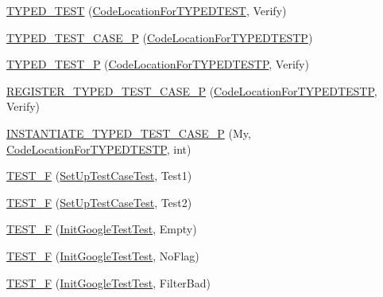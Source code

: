 \begin{DoxyCompactItemize}
\item 
\hyperlink{namespacetesting_a400c572f732b06e836d6b3a5adfc4cf7}{T\+Y\+P\+E\+D\+\_\+\+T\+E\+ST} (\hyperlink{classtesting_1_1_code_location_for_t_y_p_e_d_t_e_s_t}{Code\+Location\+For\+T\+Y\+P\+E\+D\+T\+E\+ST}, Verify)
\item 
\hyperlink{namespacetesting_a439eefbc85668f74fd9e0c2cb7c7d0b0}{T\+Y\+P\+E\+D\+\_\+\+T\+E\+S\+T\+\_\+\+C\+A\+S\+E\+\_\+P} (\hyperlink{classtesting_1_1_code_location_for_t_y_p_e_d_t_e_s_t_p}{Code\+Location\+For\+T\+Y\+P\+E\+D\+T\+E\+S\+TP})
\item 
\hyperlink{namespacetesting_a3f3fbbc7ecc23117307b81deb8f4cfac}{T\+Y\+P\+E\+D\+\_\+\+T\+E\+S\+T\+\_\+P} (\hyperlink{classtesting_1_1_code_location_for_t_y_p_e_d_t_e_s_t_p}{Code\+Location\+For\+T\+Y\+P\+E\+D\+T\+E\+S\+TP}, Verify)
\item 
\hyperlink{namespacetesting_a9fc96ebb1c0e7db169c4a5697c903f56}{R\+E\+G\+I\+S\+T\+E\+R\+\_\+\+T\+Y\+P\+E\+D\+\_\+\+T\+E\+S\+T\+\_\+\+C\+A\+S\+E\+\_\+P} (\hyperlink{classtesting_1_1_code_location_for_t_y_p_e_d_t_e_s_t_p}{Code\+Location\+For\+T\+Y\+P\+E\+D\+T\+E\+S\+TP}, Verify)
\item 
\hyperlink{namespacetesting_a111c1dea1140652727ab97ddc13eb045}{I\+N\+S\+T\+A\+N\+T\+I\+A\+T\+E\+\_\+\+T\+Y\+P\+E\+D\+\_\+\+T\+E\+S\+T\+\_\+\+C\+A\+S\+E\+\_\+P} (My, \hyperlink{classtesting_1_1_code_location_for_t_y_p_e_d_t_e_s_t_p}{Code\+Location\+For\+T\+Y\+P\+E\+D\+T\+E\+S\+TP}, int)
\item 
\hyperlink{namespacetesting_a01e948eb5427d31f70eafaf472e2bfa8}{T\+E\+S\+T\+\_\+F} (\hyperlink{classtesting_1_1_set_up_test_case_test}{Set\+Up\+Test\+Case\+Test}, Test1)
\item 
\hyperlink{namespacetesting_a8fc2e448ce96e4da357a2129d49e86e3}{T\+E\+S\+T\+\_\+F} (\hyperlink{classtesting_1_1_set_up_test_case_test}{Set\+Up\+Test\+Case\+Test}, Test2)
\item 
\hyperlink{namespacetesting_ae80ccfaa178730f49af649cd044e84e4}{T\+E\+S\+T\+\_\+F} (\hyperlink{classtesting_1_1_init_google_test_test}{Init\+Google\+Test\+Test}, Empty)
\item 
\hyperlink{namespacetesting_add96563b5ca11c20fe2766a848c2bb63}{T\+E\+S\+T\+\_\+F} (\hyperlink{classtesting_1_1_init_google_test_test}{Init\+Google\+Test\+Test}, No\+Flag)
\item 
\hyperlink{namespacetesting_ab368a135e5a7a59bceb912a5f636004a}{T\+E\+S\+T\+\_\+F} (\hyperlink{classtesting_1_1_init_google_test_test}{Init\+Google\+Test\+Test}, Filter\+Bad)
\item 

\end{DoxyCompactItemize}
